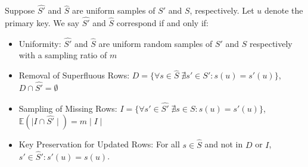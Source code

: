 \begin{property}[Correspondence]
Suppose $\widehat{S'}$ and $\widehat{S}$ are uniform samples of $S'$ and $S$, respectively.  Let $u$ denote the primary key. We say $\widehat{S'}$ and $\widehat{S}$ correspond if and only if:
\vspace{-.25em}
\begin{itemize}[noitemsep]
\item Uniformity: $\widehat{S'}$ and $\widehat{S}$ are uniform random samples of $S'$ and $S$ respectively with a sampling ratio of $m$
\item Removal of Superfluous Rows: $D = \{\forall s \in \widehat{S} \; \nexists s' \in S': s(u) = s'(u)\}$, $D \cap \widehat{S'} = \emptyset$ 
\item Sampling of Missing Rows: $I = \{\forall s' \in \widehat{S'} \; \nexists s \in S: s(u) = s'(u)\}$, $\mathbb{E}(\mid I \cap \widehat{S'} \mid) = m\mid I \mid $ 
\item Key Preservation for Updated Rows: For all $s\in \widehat{S}$ and not in $D$ or $I$, $s' \in \widehat{S}': s'(u) = s(u)$.
\end{itemize}
\vspace{-.25em}
\label{correspondence}
\end{property}






